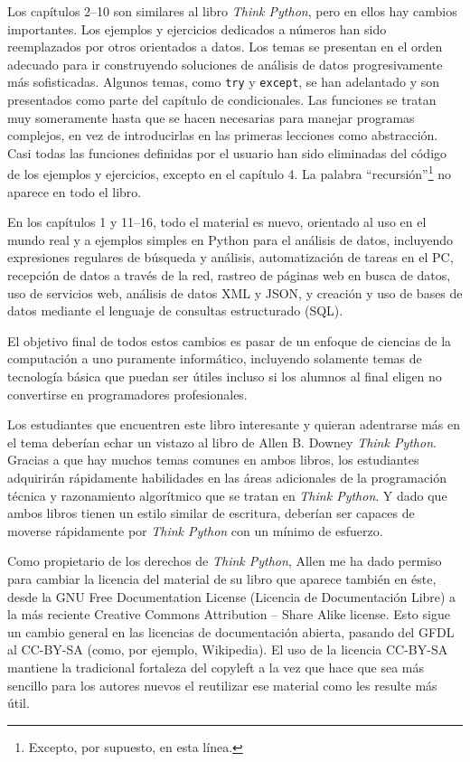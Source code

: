 Los capítulos 2--10 son similares al libro \emph{Think Python},
pero en ellos hay cambios importantes. Los ejemplos y ejercicios
dedicados a números han sido reemplazados por otros orientados a datos.
Los temas se presentan en el orden adecuado para ir construyendo soluciones
de análisis de datos progresivamente más sofisticadas.
Algunos temas, como {\tt try} y {\tt except}, se han adelantado
y son presentados como parte del capítulo de condicionales.
Las funciones se tratan muy someramente hasta que se hacen necesarias
para manejar programas complejos, en vez de introducirlas en las primeras
lecciones como abstracción. Casi todas las funciones definidas por el usuario
han sido eliminadas del código de los ejemplos y ejercicios, excepto en el capítulo 4.
La palabra ``recursión''\footnote{Excepto, por supuesto, en esta línea.}
no aparece en todo el libro.

En los capítulos 1 y 11--16, todo el material es nuevo, orientado
al uso en el mundo real y a ejemplos simples en Python para el
análisis de datos, incluyendo expresiones regulares de búsqueda y análisis,
automatización de tareas en el PC, recepción de datos a través de la red,
rastreo de páginas web en busca de datos,
uso de servicios web, análisis de datos XML y JSON, y creación y uso
de bases de datos mediante el lenguaje de consultas estructurado (SQL).

El objetivo final de todos estos cambios es pasar de un enfoque
de ciencias de la computación a uno puramente informático, incluyendo
solamente temas de tecnología básica que puedan
ser útiles incluso si los alumnos al final eligen no convertirse en
programadores profesionales.

Los estudiantes que encuentren este libro interesante y quieran adentrarse
más en el tema deberían echar un vistazo al libro de Allen B. Downey
\emph{Think Python}. Gracias a que hay muchos temas comunes en ambos libros,
los estudiantes adquirirán rápidamente habilidades en las áreas adicionales
de la programación técnica y razonamiento algorítmico que se tratan en
\emph{Think Python}.
Y dado que ambos libros tienen un estilo similar de escritura, deberían ser
capaces de moverse rápidamente por \emph{Think Python} con un mínimo de esfuerzo.

Como propietario de los derechos de \emph{Think Python},
Allen me ha dado permiso para cambiar la licencia
del material de su libro que aparece también en éste,
desde la
GNU Free Documentation License (Licencia de Documentación Libre)
a la más reciente
Creative Commons Attribution -- Share Alike license.
Esto sigue un cambio general en las licencias de documentación abierta,
pasando del GFDL al CC-BY-SA (como, por ejemplo, Wikipedia).
El uso de la licencia CC-BY-SA mantiene la tradicional fortaleza del copyleft
a la vez que hace que sea más sencillo para los autores nuevos
el reutilizar ese material como les resulte más útil.

